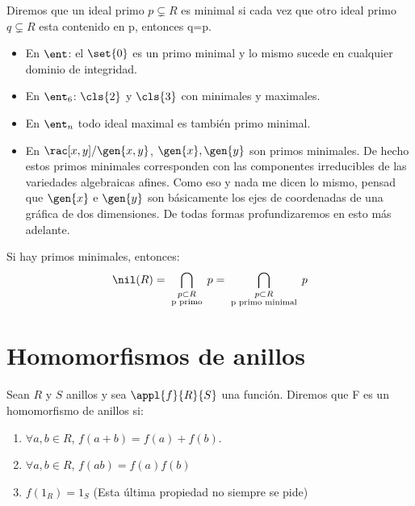 \begin{defn}
	Diremos que un ideal primo $p \subsetneq R$ es minimal si cada vez que otro ideal primo $q \subsetneq R$ esta contenido en p, entonces q=p.
\end{defn}

\begin{example}
	\begin{itemize}
		\item En $\ent$: el $\set{0}$ es un primo minimal y lo mismo sucede en cualquier dominio de integridad.
		\item En $\ent_6$: $\cls{2}$ y $\cls{3}$ con minimales y maximales.
		\item En $\ent_n$ todo ideal maximal es también primo minimal.
		\item En $\rac[x,y]/\gen{x,y}$, $\gen{x},\gen{y}$ son primos minimales. De hecho estos primos minimales corresponden con las componentes irreducibles de las variedades  algebraicas afines. Como eso y nada me dicen lo mismo, pensad que $\gen{x}$ e $\gen{y}$ son básicamente los ejes de coordenadas de una gráfica de dos dimensiones. De todas formas profundizaremos en esto más adelante.
	\end{itemize}
\end{example}

\obs Si hay primos minimales, entonces:
$$ \nil(R)=\bigcap_{\substack{p\subset R \\ \text{ p primo }}} p = \bigcap_{\substack{p\subset R \\ \text{ p primo minimal }}}p $$

\section{Homomorfismos de anillos}

\begin{defn} Sean $R$ y $S$ anillos y sea $\appl{f}{R}{S}$ una función. Diremos que F es un homomorfismo de anillos si:
\begin{enumerate}
	\item $\forall a,b \in R$, $f(a+b)=f(a)+f(b)$.
	\item $\forall a,b \in R$, $f(ab)=f(a)f(b)$
	\item $f(1_R)=1_S$ (Esta última propiedad no siempre se pide)
\end{enumerate}
\end{defn}

